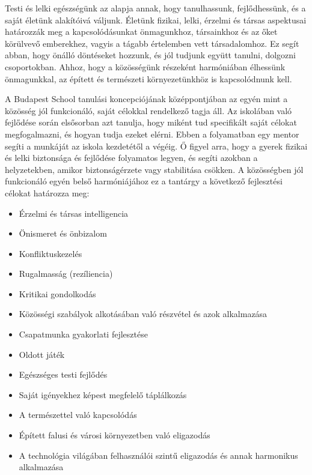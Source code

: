 Testi és lelki egészségünk az alapja annak, hogy tanulhassunk, fejlődhessünk, és a saját életünk alakítóivá váljunk. Életünk fizikai, lelki, érzelmi és társas aspektusai határozzák meg a kapcsolódásunkat önmagunkhoz, társainkhoz és az őket körülvevő emberekhez, vagyis a tágabb értelemben vett társadalomhoz. Ez segít abban, hogy önálló döntéseket hozzunk, és jól tudjunk együtt tanulni, dolgozni csoportokban. Ahhoz, hogy a közösségünk részeként harmóniában élhessünk önmagunkkal, az épített és természeti környezetünkhöz is kapcsolódnunk kell.


A Budapest School tanulási koncepciójának középpontjában az egyén mint a közösség jól funkcionáló, saját célokkal rendelkező tagja áll. Az iskolában való fejlődése során elsősorban azt tanulja, hogy miként tud specifikált saját célokat megfogalmazni, és hogyan tudja ezeket elérni. Ebben a folyamatban egy mentor segíti a munkáját az iskola kezdetétől a végéig. Ő figyel arra, hogy a gyerek fizikai és lelki biztonsága és fejlődése folyamatos legyen, és segíti azokban a helyzetekben, amikor biztonságérzete vagy stabilitása csökken. A közösségben jól funkcionáló egyén belső harmóniájához ez a tantárgy a következő fejlesztési célokat határozza meg:
\begin{itemize}
\item Érzelmi és társas intelligencia

\item Önismeret és önbizalom

\item Konfliktuskezelés

\item Rugalmasság (rezíliencia)

\item Kritikai gondolkodás

\item Közösségi szabályok alkotásában való részvétel és azok alkalmazása

\item Csapatmunka gyakorlati fejlesztése

\item Oldott játék

\item Egészséges testi fejlődés

\item Saját igényekhez képest megfelelő táplálkozás

\item A természettel való kapcsolódás

\item Épített falusi és városi környezetben való eligazodás

\item A technológia világában felhasználói szintű eligazodás és annak harmonikus alkalmazása
\end{itemize}

